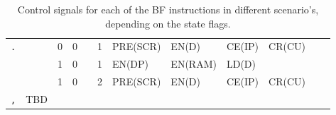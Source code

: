 \begin{table}[H]
{\begin{tabular} {c|cccc|c|llllll}
      \texttt{.} &   & 0 & 0     &      & 1     & PRE(SCR)& EN(D)   & CE(IP)  & CR(CU) &       &          \\
      \rowcolor{White}
                 &   & 1 & 0     &      & 1     & EN(DP)  & EN(RAM) & LD(D)   &        &       &          \\
      \rowcolor{White}
                 &   & 1 & 0     &      & 2     & PRE(SCR)& EN(D)   & CE(IP)  & CR(CU) &       &          \\ \hline
      \rowcolor{Gray}
      \texttt{,} & TBD & & &       &      &       &                   &         &        &       &          \\ \hline
      
      
      
    \end{tabular}
  }
  \caption{Control signals for each of the BF instructions in different scenario's, depending on the state flags.}
  \label{tab:microcode}
\end{table}
